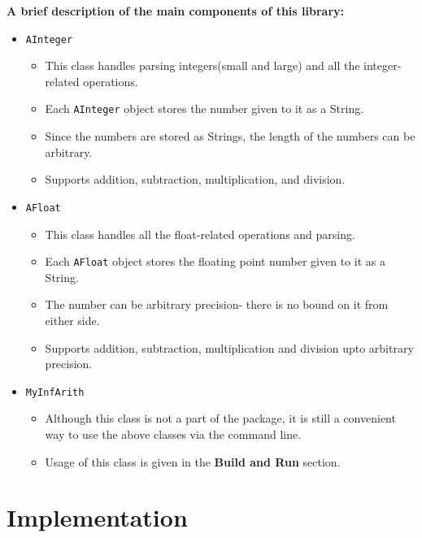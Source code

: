 \documentclass[15pt]{article}
\begin{document}
\textbf{A brief description of the main components of this library:}
\begin{itemize}
    \item \texttt{AInteger}
    \begin{itemize}
        \item This class handles parsing integers(small and large) and all the integer-related operations.
        \item Each \texttt{AInteger} object stores the number given to it as a String.
        \item Since the numbers are stored as Strings, the length of the numbers can be arbitrary.
        \item Supports addition, subtraction, multiplication, and division.
    \end{itemize}
    
    \item \texttt{AFloat}
    \begin{itemize}
        \item This class handles all the float-related operations and parsing.
        \item Each \texttt{AFloat} object stores the floating point number given to it as a String.
        \item The number can be arbitrary precision- there is no bound on it from either side.
        \item Supports addition, subtraction, multiplication and division upto arbitrary precision.
    \end{itemize}
    
    \item \texttt{MyInfArith}
    \begin{itemize}
        \item Although this class is not a part of the package, it is still a convenient way to use the above classes via the command line.
        \item Usage of this class is given in the \textbf{Build and Run} section.
    \end{itemize}
\end{itemize}

\section{Implementation}
\end{document}
